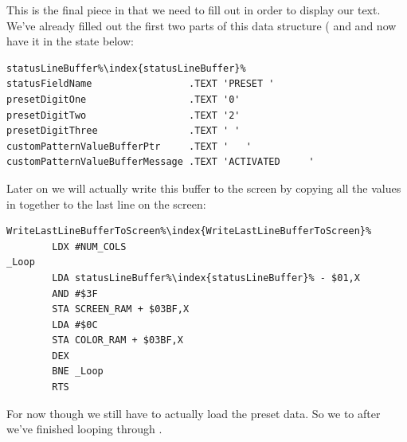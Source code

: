This is the final piece in  that we need to fill out
in order to display our text. We've already filled out the first two parts of this data structure ( and  
and now have it in the state below: 

\begin{lstlisting}[escapechar=\%]
statusLineBuffer%\index{statusLineBuffer}%
statusFieldName                 .TEXT 'PRESET '
presetDigitOne                  .TEXT '0'
presetDigitTwo                  .TEXT '2'
presetDigitThree                .TEXT ' '
customPatternValueBufferPtr     .TEXT '   '
customPatternValueBufferMessage .TEXT 'ACTIVATED     '
\end{lstlisting}

Later on we will actually write this buffer to the screen by copying all the values in  together to the last line on the screen:

\begin{lstlisting}[escapechar=\%]
WriteLastLineBufferToScreen%\index{WriteLastLineBufferToScreen}%    
        LDX #NUM_COLS
_Loop   
        LDA statusLineBuffer%\index{statusLineBuffer}% - $01,X
        AND #$3F
        STA SCREEN_RAM + $03BF,X
        LDA #$0C
        STA COLOR_RAM + $03BF,X
        DEX 
        BNE _Loop
        RTS 
\end{lstlisting}

For now though we still have to actually load the preset data. So we  to  after we've finished looping through .

